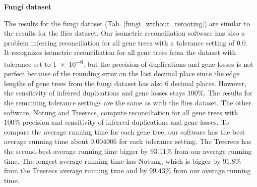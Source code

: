 \noindent \textbf{Fungi dataset}

The results for the fungi dataset (Tab. \ref{fungi_without_rerooting}) are similar to the results for the flies dataset. Our isometric reconciliation software has also a problem inferring reconciliation for all gene trees with a tolerance setting of $0.0$. It recognizes isometric reconciliation for all gene trees from the dataset with tolerance set to \num{1e-6}, but the precision of duplications and gene losses is not perfect because of the rounding error on the last decimal place since the edge lengths of gene trees from the fungi dataset has also 6 decimal places. However, the sensitivity of inferred duplications and gene losses stays $100\%$. The results for the remaining tolerance settings are the same as with the flies dataset. The other software, Notung and Treerecs, compute reconciliation for all gene trees with $100\%$ precision and sensitivity of inferred duplications and gene losses. To compare the average running time for each gene tree, our software has the best average running time about $0.004006$ for each tolerance setting. The Treerecs has the second-best average running time bigger by $93.11\%$ from our average running time. The longest average running time has Notung, which is bigger by $91.8\%$ from the Treerecs average running time and by $99.43\%$ from our average running time.

